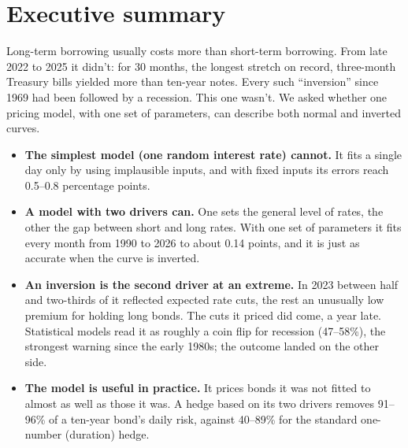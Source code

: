 





\makeheader

\section*{Executive summary}
\begin{keybox}
Long-term borrowing usually costs more than short-term borrowing. From late 2022 to 2025 it didn't: for 30 months, the longest stretch on record, three-month Treasury bills yielded more than ten-year notes. Every such ``inversion'' since 1969 had been followed by a recession. This one wasn't. We asked whether one pricing model, with one set of parameters, can describe both normal and inverted curves.

\begin{itemize}
  \item \textbf{The simplest model (one random interest rate) cannot.} It fits a single day only by using implausible inputs, and with fixed inputs its errors reach 0.5--0.8 percentage points.
  \item \textbf{A model with two drivers can.} One sets the general level of rates, the other the gap between short and long rates. With one set of parameters it fits every month from 1990 to 2026 to about 0.14 points, and it is just as accurate when the curve is inverted.
  \item \textbf{An inversion is the second driver at an extreme.} In 2023 between half and two-thirds of it reflected expected rate cuts, the rest an unusually low premium for holding long bonds. The cuts it priced did come, a year late. Statistical models read it as roughly a coin flip for recession (47--58\%), the strongest warning since the early 1980s; the outcome landed on the other side.
  \item \textbf{The model is useful in practice.} It prices bonds it was not fitted to almost as well as those it was. A hedge based on its two drivers removes 91--96\% of a ten-year bond's daily risk, against 40--89\% for the standard one-number (duration) hedge.
\end{itemize}
\end{keybox}

